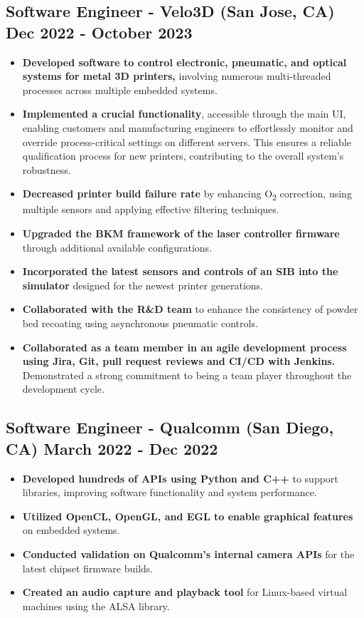 \documentclass[]{article}
\begin{document}
\vspace{1ex}

\subsection{{\large{Software Engineer - Velo3D} (San Jose, CA) \hfill {\small{Dec 2022 - October 2023}}}}

\begin{itemize}
    \item \textbf{Developed software to control electronic, pneumatic, and optical systems for metal 3D printers,} involving numerous multi-threaded processes across multiple embedded systems.
    \item \textbf{Implemented a crucial functionality}, accessible through the main UI, enabling customers and manufacturing engineers to effortlessly monitor and override process-critical settings on different servers. 
    This ensures a reliable qualification process for new printers, contributing to the overall system's robustness.
    \item \textbf{Decreased printer build failure rate} by enhancing O\textsubscript{2} correction, using multiple sensors and applying effective filtering techniques.
    \item \textbf{Upgraded the BKM framework of the laser controller firmware} through additional available configurations.
    \item \textbf{Incorporated the latest sensors and controls of an SIB into the simulator} designed for the newest printer generations.
    \item \textbf{Collaborated with the R\&D team} to enhance the consistency of powder bed recoating using asynchronous pneumatic controls.
    \item \textbf{Collaborated as a team member in an agile development process using Jira, Git, pull request reviews and CI/CD with Jenkins.} Demonstrated a strong commitment to being a team player throughout the development cycle.
\end{itemize}

\vspace{2ex}

\subsection{{\large{Software Engineer - Qualcomm} (San Diego, CA) \hfill{\small{March 2022 - Dec 2022}}}}

\begin{itemize}
    \item \textbf{Developed hundreds of APIs using Python and C++} to support libraries, improving software functionality and system performance.
    \item \textbf{Utilized OpenCL, OpenGL, and EGL to enable graphical features} on embedded systems.
    \item \textbf{Conducted validation on Qualcomm's internal camera APIs} for the latest chipset firmware builds. 
    \item \textbf{Created an audio capture and playback tool} for Linux-based virtual machines using the ALSA library.
\end{itemize}
\end{document}
